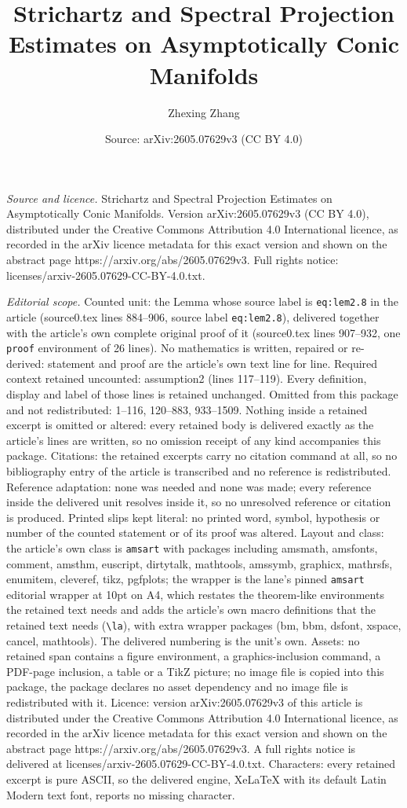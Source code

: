 \documentclass[10pt,a4paper]{amsart}
\title[Strichartz and Spectral Projection Estimates on Asymptotical]{Strichartz and Spectral Projection Estimates on Asymptotically Conic Manifolds}
\author{Zhexing Zhang}
\date{Source: arXiv:2605.07629v3 (CC BY 4.0)}
\begin{document}
\maketitle

\noindent\emph{Source and licence.} Strichartz and Spectral Projection Estimates on Asymptotically Conic Manifolds. Version arXiv:2605.07629v3 (CC BY 4.0), distributed under the Creative Commons Attribution 4.0 International licence, as recorded in the arXiv licence metadata for this exact version and shown on the abstract page https://arxiv.org/abs/2605.07629v3. Full rights notice: licenses/arxiv-2605.07629-CC-BY-4.0.txt.\par\smallskip

\noindent\textit{Editorial scope.} Counted unit: the Lemma whose source label is \texttt{eq:lem2.8} in the article (source0.tex lines 884--906, source label \texttt{eq:lem2.8}), delivered together with the article's own complete original proof of it (source0.tex lines 907--932, one \texttt{proof} environment of 26 lines). No mathematics is written, repaired or re-derived: statement and proof are the article's own text line for line. Required context retained uncounted: assumption2 (lines 117--119). Every definition, display and label of those lines is retained unchanged. Omitted from this package and not redistributed: 1--116, 120--883, 933--1509. Nothing inside a retained excerpt is omitted or altered: every retained body is delivered exactly as the article's lines are written, so no omission receipt of any kind accompanies this package. Citations: the retained excerpts carry no citation command at all, so no bibliography entry of the article is transcribed and no reference is redistributed. Reference adaptation: none was needed and none was made; every reference inside the delivered unit resolves inside it, so no unresolved reference or citation is produced. Printed slips kept literal: no printed word, symbol, hypothesis or number of the counted statement or of its proof was altered. Layout and class: the article's own class is \texttt{amsart} with packages including amsmath, amsfonts, comment, amsthm, euscript, dirtytalk, mathtools, amssymb, graphicx, mathrsfs, enumitem, cleveref, tikz, pgfplots; the wrapper is the lane's pinned \texttt{amsart} editorial wrapper at 10pt on A4, which restates the theorem-like environments the retained text needs and adds the article's own macro definitions that the retained text needs (\texttt{\textbackslash la}), with extra wrapper packages (bm, bbm, dsfont, xspace, cancel, mathtools). The delivered numbering is the unit's own. Assets: no retained span contains a figure environment, a graphics-inclusion command, a PDF-page inclusion, a table or a TikZ picture; no image file is copied into this package, the package declares no asset dependency and no image file is redistributed with it. Licence: version arXiv:2605.07629v3 of this article is distributed under the Creative Commons Attribution 4.0 International licence, as recorded in the arXiv licence metadata for this exact version and shown on the abstract page https://arxiv.org/abs/2605.07629v3. A full rights notice is delivered at licenses/arxiv-2605.07629-CC-BY-4.0.txt. Characters: every retained excerpt is pure ASCII, so the delivered engine, XeLaTeX with its default Latin Modern text font, reports no missing character.
\end{document}
